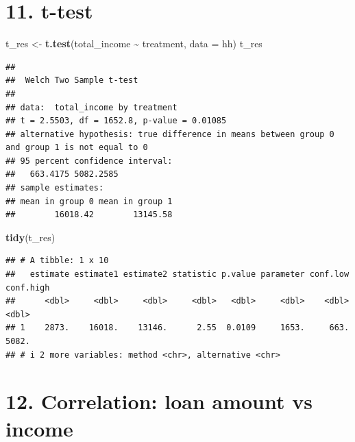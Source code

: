 \documentclass[
]{article}
\newenvironment{Shaded}{\begin{snugshade}}{\end{snugshade}}
\newcommand{\AttributeTok}[1]{\textcolor[rgb]{0.13,0.29,0.53}{#1}}
\newcommand{\DecValTok}[1]{\textcolor[rgb]{0.00,0.00,0.81}{#1}}
\newcommand{\FunctionTok}[1]{\textcolor[rgb]{0.13,0.29,0.53}{\textbf{#1}}}
\newcommand{\NormalTok}[1]{#1}
\newcommand{\OtherTok}[1]{\textcolor[rgb]{0.56,0.35,0.01}{#1}}
\newcommand{\SpecialCharTok}[1]{\textcolor[rgb]{0.81,0.36,0.00}{\textbf{#1}}}
\newcommand{\StringTok}[1]{\textcolor[rgb]{0.31,0.60,0.02}{#1}}
\begin{document}
\section{11. t-test}\label{t-test}

\begin{Shaded}
\begin{Highlighting}[]
\NormalTok{t\_res }\OtherTok{\textless{}{-}} \FunctionTok{t.test}\NormalTok{(total\_income }\SpecialCharTok{\textasciitilde{}}\NormalTok{ treatment, }\AttributeTok{data =}\NormalTok{ hh)}
\NormalTok{t\_res}
\end{Highlighting}
\end{Shaded}

\begin{verbatim}
## 
##  Welch Two Sample t-test
## 
## data:  total_income by treatment
## t = 2.5503, df = 1652.8, p-value = 0.01085
## alternative hypothesis: true difference in means between group 0 and group 1 is not equal to 0
## 95 percent confidence interval:
##   663.4175 5082.2585
## sample estimates:
## mean in group 0 mean in group 1 
##        16018.42        13145.58
\end{verbatim}

\begin{Shaded}
\begin{Highlighting}[]
\FunctionTok{tidy}\NormalTok{(t\_res)}
\end{Highlighting}
\end{Shaded}

\begin{verbatim}
## # A tibble: 1 x 10
##   estimate estimate1 estimate2 statistic p.value parameter conf.low conf.high
##      <dbl>     <dbl>     <dbl>     <dbl>   <dbl>     <dbl>    <dbl>     <dbl>
## 1    2873.    16018.    13146.      2.55  0.0109     1653.     663.     5082.
## # i 2 more variables: method <chr>, alternative <chr>
\end{verbatim}

\section{12. Correlation: loan amount vs
income}\label{correlation-loan-amount-vs-income}

\begin{Shaded}
\end{Shaded}
\end{document}
